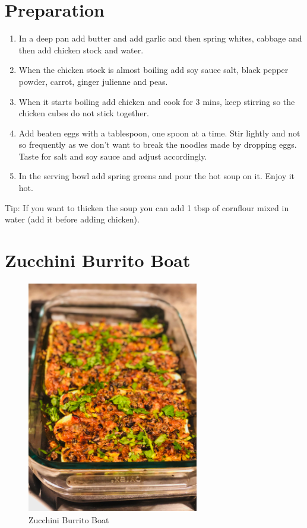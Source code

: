 \documentclass[
  oneside]{book}
\begin{document}
\hypertarget{preparation-3}{%
\section{Preparation}\label{preparation-3}}

\begin{enumerate}
\def\labelenumi{\arabic{enumi}.}
\item
  In a deep pan add butter and add garlic and then spring whites, cabbage and then add chicken stock and water.
\item
  When the chicken stock is almost boiling add soy sauce salt, black pepper powder, carrot, ginger julienne and peas.
\item
  When it starts boiling add chicken and cook for 3 mins, keep stirring so the chicken cubes do not stick together.
\item
  Add beaten eggs with a tablespoon, one spoon at a time. Stir lightly and not so frequently as we don't want to break the noodles made by dropping eggs. Taste for salt and soy sauce and adjust accordingly.
\item
  In the serving bowl add spring greens and pour the hot soup on it. Enjoy it hot.
\end{enumerate}

Tip:
If you want to thicken the soup you can add 1 tbsp of cornflour mixed in water (add it before adding chicken).

\hypertarget{zucchini-burrito-boat}{%
\section{Zucchini Burrito Boat}\label{zucchini-burrito-boat}}

\begin{figure}
\centering
\includegraphics{pictures/zucchini-burrito-boat.png}
\caption{Zucchini Burrito Boat}
\end{figure}
\end{document}
